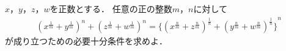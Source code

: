 \documentclass[../../main.tex]{subfiles}
\begin{document}
$x$，$y$，$z$，$w$を正数とする．
任意の正の整数$m$，$n$に対して
\begin{align}
  {(x^{\frac{1}{m}}+y^{\frac{1}{m}})}^n+{(z^{\frac{1}{m}}+w^{\frac{1}{m}})}^n=
  { \{ {(x^{\frac{n}{m}}+z^{\frac{n}{m}})}^{\frac{1}{n}}+{(y^{\frac{n}{m}}+w^{\frac{n}{m}})}^{\frac{1}{n}} \} }^n
\end{align}
が成り立つための必要十分条件を求めよ．
\end{document}
